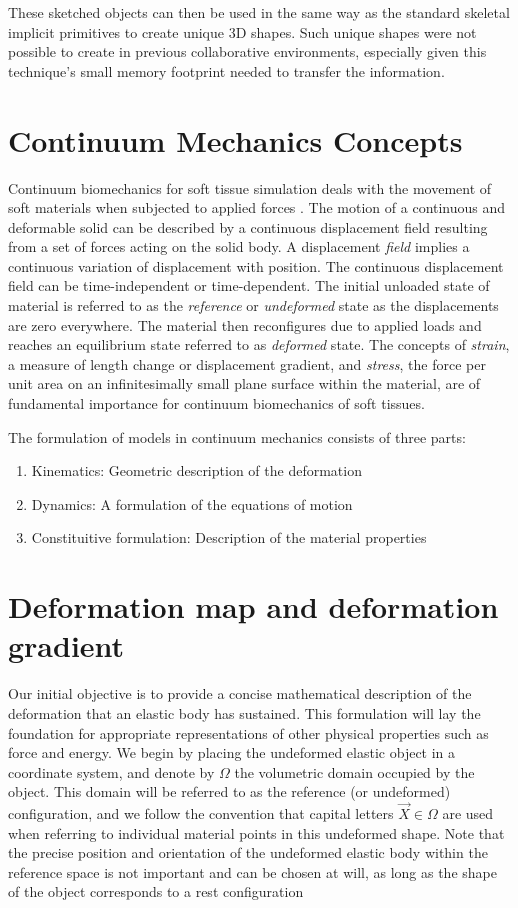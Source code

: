 These sketched objects can then be used in the same way as the standard skeletal implicit primitives to create unique 3D shapes. Such 
unique shapes were not possible to create in previous collaborative environments, especially given this technique’s small memory footprint 
needed to transfer the information.

\section{Continuum Mechanics Concepts} 
Continuum biomechanics for soft tissue simulation deals with the movement of soft materials when subjected to applied forces \cite{Sifakis2012}. 
The motion of a continuous and deformable solid can be described by a continuous displacement field resulting from a set of 
forces acting on the solid body. A displacement \textit{field} implies a continuous variation of displacement with position. 
The continuous displacement field can be time-independent or time-dependent. The initial unloaded state of material is referred to 
as the \textit{reference} or \textit{undeformed} state as the displacements are zero everywhere. The material then reconfigures due to 
applied loads and reaches an equilibrium state referred to as \textit{deformed} state. The concepts of \textit{strain}, a measure of length
change or displacement gradient, and \textit{stress}, the force per unit area on an infinitesimally small plane surface within the material, 
are of fundamental importance for continuum biomechanics of soft tissues. 

The formulation of models in continuum mechanics consists of three parts:

\begin{enumerate}
 \item Kinematics: Geometric description of the deformation
 \item Dynamics: A formulation of the equations of motion
 \item Constituitive formulation: Description of the material properties
\end{enumerate}

\section{Deformation map and deformation gradient}
Our initial objective is to provide a concise mathematical description of the deformation that an elastic body has sustained. This formulation will 
lay the foundation for appropriate representations of other physical properties such as force and energy. We begin by placing the undeformed elastic 
object in a coordinate system, and denote by $\Omega$ the volumetric domain occupied by the object. This domain will be referred to as the reference 
(or undeformed) configuration, and we follow the convention that capital letters $\vec{X} \in \Omega$ are used when referring to individual material
points in this undeformed shape. Note that the precise position and orientation of the undeformed elastic body within the reference space is not important 
and can be chosen at will, as long as the shape of the object corresponds to a rest configuration

